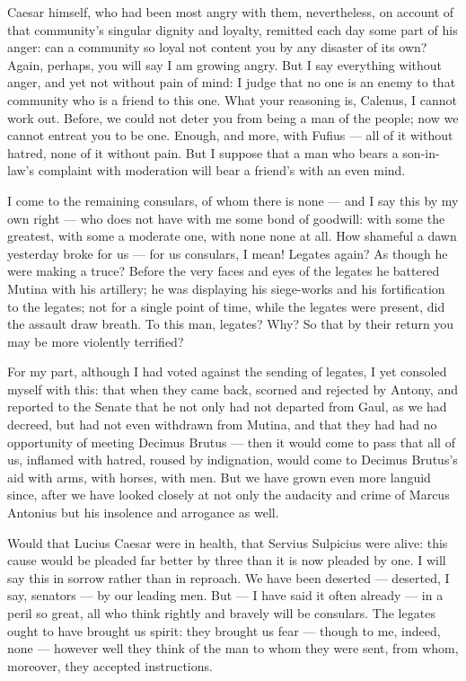  Caesar himself, who had been most angry with them, nevertheless, on account of that community's singular dignity and loyalty, remitted each day some part of his anger: can a community so loyal not content you by any disaster of its own? Again, perhaps, you will say I am growing angry. But I say everything without anger, and yet not without pain of mind: I judge that no one is an enemy to that community who is a friend to this one. What your reasoning is, Calenus, I cannot work out. Before, we could not deter you from being a man of the people; now we cannot entreat you to be one. Enough, and more, with Fufius --- all of it without hatred, none of it without pain. But I suppose that a man who bears a son-in-law's complaint with moderation will bear a friend's with an even mind.

 I come to the remaining consulars, of whom there is none --- and I say this by my own right --- who does not have with me some bond of goodwill: with some the greatest, with some a moderate one, with none none at all. How shameful a dawn yesterday broke for us --- for us consulars, I mean! Legates again? As though he were making a truce? Before the very faces and eyes of the legates he battered Mutina with his artillery; he was displaying his siege-works and his fortification to the legates; not for a single point of time, while the legates were present, did the assault draw breath. To this man, legates? Why? So that by their return you may be more violently terrified?

 For my part, although I had voted against the sending of legates, I yet consoled myself with this: that when they came back, scorned and rejected by Antony, and reported to the Senate that he not only had not departed from Gaul, as we had decreed, but had not even withdrawn from Mutina, and that they had had no opportunity of meeting Decimus Brutus --- then it would come to pass that all of us, inflamed with hatred, roused by indignation, would come to Decimus Brutus's aid with arms, with horses, with men. But we have grown even more languid since, after we have looked closely at not only the audacity and crime of Marcus Antonius but his insolence and arrogance as well.

 Would that Lucius Caesar were in health, that Servius Sulpicius were alive: this cause would be pleaded far better by three than it is now pleaded by one. I will say this in sorrow rather than in reproach. We have been deserted --- deserted, I say, senators --- by our leading men. But --- I have said it often already --- in a peril so great, all who think rightly and bravely will be consulars. The legates ought to have brought us spirit: they brought us fear --- though to me, indeed, none --- however well they think of the man to whom they were sent, from whom, moreover, they accepted instructions.

